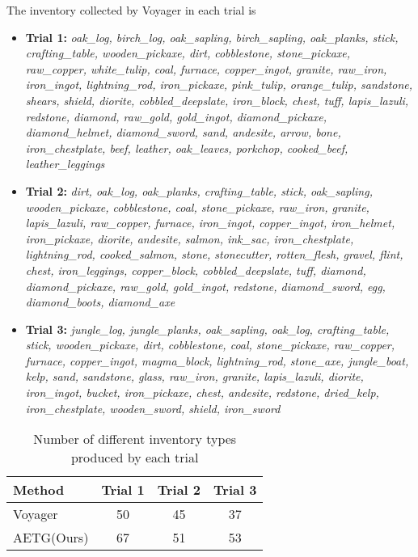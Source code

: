 The inventory collected by Voyager in each trial is
\begin{itemize}
    \item \textbf{Trial 1:}  \textit{oak\_log, birch\_log, oak\_sapling, birch\_sapling, oak\_planks, stick, crafting\_table, wooden\_pickaxe, dirt, cobblestone, stone\_pickaxe, raw\_copper, white\_tulip, coal, furnace, copper\_ingot, granite, raw\_iron, iron\_ingot, lightning\_rod, iron\_pickaxe, pink\_tulip, orange\_tulip, sandstone, shears, shield, diorite, cobbled\_deepslate, iron\_block, chest, tuff, lapis\_lazuli, redstone, diamond, raw\_gold, gold\_ingot, diamond\_pickaxe, diamond\_helmet, diamond\_sword, sand, andesite, arrow, bone, iron\_chestplate, beef, leather, oak\_leaves, porkchop, cooked\_beef, leather\_leggings}

    \item \textbf{Trial 2:}  \textit{dirt, oak\_log, oak\_planks, crafting\_table, stick, oak\_sapling, wooden\_pickaxe, cobblestone, coal, stone\_pickaxe, raw\_iron, granite, lapis\_lazuli, raw\_copper, furnace, iron\_ingot, copper\_ingot, iron\_helmet, iron\_pickaxe, diorite, andesite, salmon, ink\_sac, iron\_chestplate, lightning\_rod, cooked\_salmon, stone, stonecutter, rotten\_flesh, gravel, flint, chest, iron\_leggings, copper\_block, cobbled\_deepslate, tuff, diamond, diamond\_pickaxe, raw\_gold, gold\_ingot, redstone, diamond\_sword, egg, diamond\_boots, diamond\_axe}

    \item \textbf{Trial 3:}  \textit{jungle\_log, jungle\_planks, oak\_sapling, oak\_log, crafting\_table, stick, wooden\_pickaxe, dirt, cobblestone, coal, stone\_pickaxe, raw\_copper, furnace, copper\_ingot, magma\_block, lightning\_rod, stone\_axe, jungle\_boat, kelp, sand, sandstone, glass, raw\_iron, granite, lapis\_lazuli, diorite, iron\_ingot, bucket, iron\_pickaxe, chest, andesite, redstone, dried\_kelp, iron\_chestplate, wooden\_sword, shield, iron\_sword}
\end{itemize}

\vskip -0.2in
\begin{table}[H]
\caption{Number of different inventory types produced by each trial}
\label{tab:Number}
\setlength{\tabcolsep}{12pt} %
\renewcommand{\arraystretch}{1.0} %
\begin{center}
\begin{small}
\begin{sc}
\begin{tabular}{lccc} %
\toprule
\textnormal{\textbf{Method}} & \textnormal{\textbf{Trial 1}} & \textnormal{\textbf{Trial 2}} & \textnormal{\textbf{Trial 3}}  \\
\midrule
\normalfont Voyager     & 50  & 45  & 37    \\
\normalfont AETG(Ours)  & 67  & 51  & 53    \\
\bottomrule
\end{tabular}
\end{sc}
\end{small}
\end{center}
\vskip -0.1in
\end{table}


